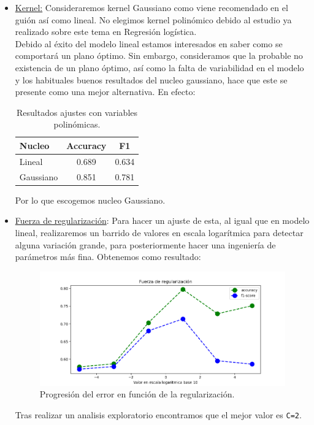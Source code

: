 \documentclass[11pt,a4paper]{article}
\begin{document}
\begin{itemize}
\item \underline{Kernel:} Consideraremos kernel Gaussiano como viene recomendado en el guión así como lineal. No elegimos kernel polinómico debido al estudio ya realizado sobre este tema en Regresión logística.\\

Debido al éxito del modelo lineal estamos interesados en saber como se comportará un plano óptimo. Sin embargo, consideramos que la probable no existencia de un plano
  óptimo, así como la falta de variabilidad en el modelo y los habituales buenos resultados del nucleo gaussiano, hace que este se presente como una mejor alternativa. En efecto:

\begin{table}[h]
\begin{center}
\begin{tabular}{|l|c|c|}
\hline
  Nucleo & Accuracy & F1 \\ \hline
Lineal & 0.689 & 0.634 \\
Gaussiano & 0.851 & 0.781  \\\hline
\end{tabular}
\caption{Resultados ajustes con variables polinómicas.}

\end{center}
\end{table}
Por lo que escogemos nucleo Gaussiano.

\item \underline{Fuerza de regularización}: Para hacer un ajuste de esta, al igual que en modelo lineal, realizaremos un barrido de valores en escala logarítmica para detectar alguna variación grande, para posteriormente hacer una ingeniería de parámetros más fina. Obtenemos como resultado:

    \begin{figure}[h!]
      \label{figure:regularization}
      \centering
      \includegraphics[width=\textwidth]{./figures/regularizacion_SVM.png}
      \caption{Progresión del error en función de la regularización.}
    \end{figure}
  
  Tras realizar un analisis exploratorio encontramos que el mejor valor es \texttt{C=2}.

\end{itemize}
\end{document}
